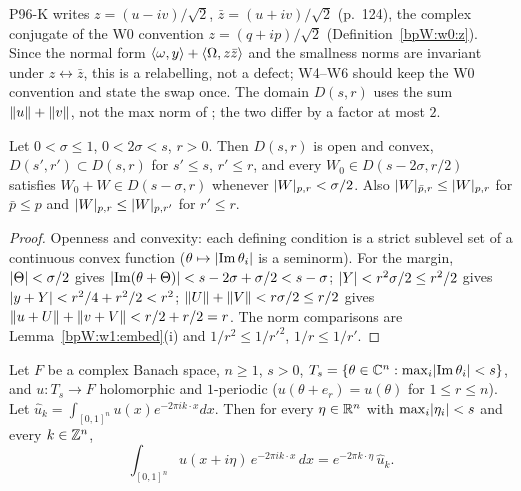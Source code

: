 \begin{remark}\label{bpW:w1:kam-conventions}
P96-K writes $z=(u-iv)/\sqrt2$, $\bar z=(u+iv)/\sqrt2$ (p.~124), the complex conjugate of the W0 convention
$z=(q+ip)/\sqrt2$ (Definition~\ref{bpW:w0:z}). Since the normal form $\langle \omega,y\rangle+\langle \Omega,z\bar z\rangle$ and the
smallness norms are invariant under $z\leftrightarrow\bar z$, this is a relabelling, not a defect; W4--W6 should keep the
W0 convention and state the swap once. The domain $D(s,r)$ uses the sum $\lVert u\rVert+\lVert v\rVert$, not the max norm of
; the two differ by a factor at most $2$.
\end{remark}

\begin{lemma}[Domains]\label{bpW:w1:kam-domain}
Let $0<\sigma\le1$, $0<2\sigma<s$, $r>0$. Then $D(s,r)$ is open and convex, $D(s',r')\subset D(s,r)$ for $s'\le s$, $r'\le r$,
and every $W_0\in D(s-2\sigma,r/2)$ satisfies $W_0+W\in D(s-\sigma,r)$ whenever $\lvert W\rvert_{p,r}<\sigma/2$. Also
$\lvert W\rvert_{\bar p,r}\le\lvert W\rvert_{p,r}$ for $\bar p\le p$ and $\lvert W\rvert_{p,r}\le\lvert W\rvert_{p,r'}$ for $r'\le r$.
\end{lemma}

\begin{proof}
Openness and convexity: each defining condition is a strict sublevel set of a continuous convex function
($\theta\mapsto\lvert \operatorname{Im}\theta_i\rvert$ is a seminorm). For the margin, $\lvert \Theta\rvert<\sigma/2$ gives
$\lvert \operatorname{Im}(\theta+\Theta)\rvert<s-2\sigma+\sigma/2<s-\sigma$; $\lvert Y\rvert<r^2\sigma/2\le r^2/2$ gives
$\lvert y+Y\rvert<r^2/4+r^2/2<r^2$; $\lVert U\rVert+\lVert V\rVert<r\sigma/2\le r/2$ gives $\lVert u+U\rVert+\lVert v+V\rVert<r/2+r/2=r$. The norm
comparisons are Lemma~\ref{bpW:w1:embed}(i) and $1/r^2\le1/r'^2$, $1/r\le1/r'$.
\end{proof}

\begin{lemma}\label{bpW:w1:fourier-shift}
Let $F$ be a complex Banach space, $n\ge1$, $s>0$, $T_s=\{\theta\in\mathbb{C}^n:\max_i\lvert \operatorname{Im}\theta_i\rvert<s\}$, and
$u:T_s\to F$ holomorphic and $1$-periodic ($u(\theta+e_r)=u(\theta)$ for $1\le r\le n$). Let
$\hat u_k=\int_{[0,1]^n}u(x)e^{-2\pi ik\cdot x}dx$. Then for every $\eta\in\mathbb{R}^n$ with $\max_i\lvert \eta_i\rvert<s$ and every
$k\in\mathbb{Z}^n$,
\[\int_{[0,1]^n}u(x+i\eta)\,e^{-2\pi ik\cdot x}\,dx=e^{-2\pi k\cdot\eta}\,\hat u_k .\]
\end{lemma}

